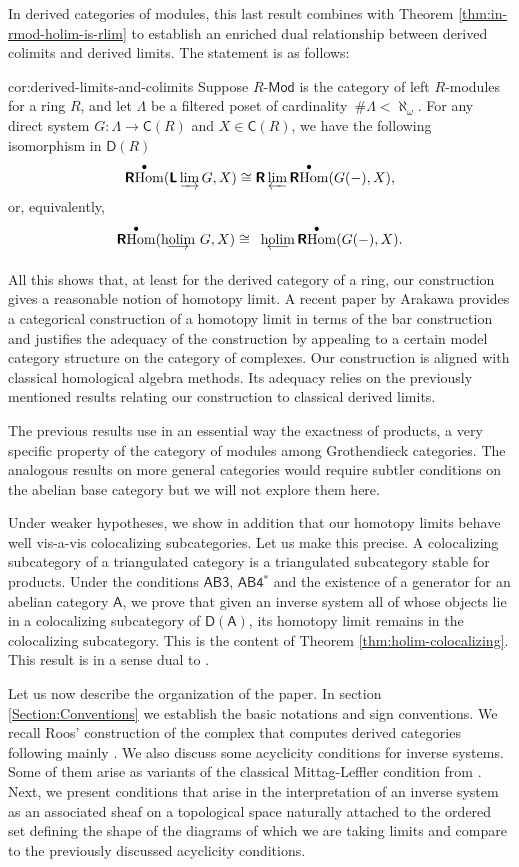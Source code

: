 \documentclass[reqno,11pt]{amsart}
\theoremstyle{plain}
\theoremstyle{remark}
\theoremstyle{definition}
\numberwithin{equation}{thm}
\newcommand{\SA}{\mathsf{A}}
\newcommand{\CCC}{\boldsymbol{\mathsf{C}}}
\newcommand{\D}{\boldsymbol{\mathsf{D}}}
\newcommand{\LL}{\boldsymbol{\mathsf{L}}}
\newcommand{\R}{\boldsymbol{\mathsf{R}}}
\newcommand{\holim}[1]{\begin{array}[t]{c} {\rm holim}\\[-7.5 pt]
		{\longleftarrow} \end{array}}
\newcommand{\hocolim}[1]{\begin{array}[t]{c} {\rm holim}\\[-7.5 pt]
		{\longrightarrow} \end{array}}
\DeclareMathOperator{\Hom}{Hom}
\DeclareMathOperator{\rhom}{\R\!\Hom}
\newcommand{\md}{\text{-}\mathsf{Mod}}
\begin{document}
In derived categories of modules, this last result combines with Theorem \ref{thm:in-rmod-holim-is-rlim} to establish an enriched dual relationship between derived colimits and derived limits. The statement is as follows:

\begin{repcor}{cor:derived-limits-and-colimits}
	Suppose $R\md$ is the category of left $R$-modules for a ring $R$, and let $\Lambda$ be a filtered poset of cardinality \,$\#\Lambda < \aleph_\omega$. For any direct system $G \colon \Lambda \to \CCC(R)$ and $X \in \CCC(R)$, we have the following isomorphism in $\D(R)$
	\[
	\rhom^\bullet(\LL\varinjlim G, X) \cong \R\varprojlim \rhom^\bullet(G(-),X),
	\]
	or, equivalently,
	\[
	\rhom^\bullet(\!\!\!\hocolim{}\!G, X) \cong \holim{} \!\!\!\rhom^\bullet(G(-),X).
	\]
\end{repcor}

All this shows that, at least for the derived category of a ring, our construction gives a reasonable  notion of homotopy limit. A recent paper by Arakawa \cite{Arak} provides a categorical construction of a homotopy limit in terms of the bar construction and justifies the adequacy of the construction by appealing to a certain model category structure on the category of complexes. Our construction is aligned with classical homological algebra methods. Its adequacy relies on the previously mentioned results relating our construction to classical derived limits.

The previous results use in an essential way the exactness of products, a very specific property of the category of modules among Grothendieck categories. The analogous results on more general categories would require subtler conditions on the abelian base category but we will not explore them here.

Under weaker hypotheses, we show in addition that our homotopy limits behave well vis-a-vis  colocalizing subcategories. Let us make this precise. A colocalizing subcategory of a triangulated category is a triangulated subcategory stable for products. Under the conditions $\mathsf{AB3}$, $\mathsf{AB4^*}$ and the existence of a generator for an abelian category $\SA$, we prove that given an inverse system all of whose objects lie in a colocalizing subcategory of $\D(\SA)$, its homotopy limit remains in the colocalizing subcategory. This is the content of Theorem \ref{thm:holim-colocalizing}. This result is in a sense dual to \cite[Theorem 3.1]{AJS}.

Let us now describe the organization of the paper. In section \ref{Section:Conventions} we establish the basic notations and sign conventions. We recall Roos' construction of the complex that computes derived categories following mainly \cite{Ntc}. We also discuss some acyclicity conditions for inverse systems. Some of them arise as variants of the classical Mittag-Leffler condition from \cite{ega3}. Next, we present conditions that arise in the interpretation of an inverse system as an associated sheaf on a topological space naturally attached to the ordered set defining the shape of the diagrams of which we are taking limits and compare to the previously discussed acyclicity conditions.
\end{document}
